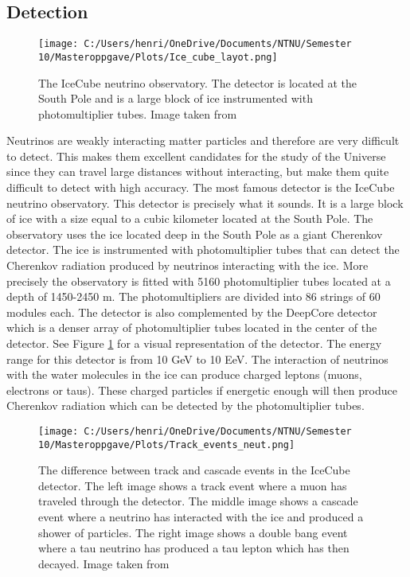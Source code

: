  

\subsection{Detection}
\begin{figure}
    \centering
    \texttt{[image: C:/Users/henri/OneDrive/Documents/NTNU/Semester 10/Masteroppgave/Plots/Ice\_cube\_layot.png]}
    \caption{The IceCube neutrino observatory. The detector is located at the South Pole and is a large block of ice instrumented with photomultiplier tubes. Image taken from \cite{Andeen_2019}}
    \label{fig:Ice_cube}
\end{figure}

Neutrinos are weakly interacting matter particles and therefore are very difficult to detect. This makes them excellent candidates for the study of the Universe since they can travel large distances without interacting, but make them 
quite difficult to detect with high accuracy. The most famous detector is the IceCube neutrino observatory. This detector is precisely what it sounds. It is a large block of ice with a size equal to a cubic kilometer located at the South Pole.
The observatory uses the ice located deep in the South Pole as a giant Cherenkov detector. The ice is instrumented with photomultiplier tubes that can detect the Cherenkov radiation produced by neutrinos interacting with the ice. 
More precisely the observatory is fitted with 5160 photomultiplier tubes located at a depth of 1450-2450 m. The photomultipliers are divided into 86 strings of 60 modules each. The detector is also complemented by the DeepCore detector which is a denser array of photomultiplier tubes located in the center of the detector. See Figure \ref{fig:Ice_cube} for a visual representation of the detector.
The energy range for this detector is from 10 GeV to 10 EeV. The interaction of neutrinos with the water molecules in the ice can produce charged leptons (muons, electrons or taus). These charged particles if energetic enough will then produce Cherenkov radiation which can be detected by the photomultiplier tubes.

\begin{figure}
    \centering
    \texttt{[image: C:/Users/henri/OneDrive/Documents/NTNU/Semester 10/Masteroppgave/Plots/Track\_events\_neut.png]}
    \caption{The difference between track and cascade events in the IceCube detector. The left image shows a track event where a muon has traveled through the detector. The middle image shows a cascade event where a neutrino has interacted with the ice and produced a shower of particles. The right image shows a double bang event where a tau neutrino has produced a tau lepton which has then decayed. Image taken from \cite{LectureA}}
    \label{fig:track_neut}
\end{figure}


